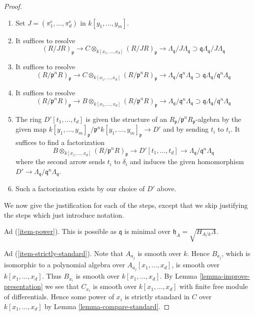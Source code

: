 \begin{proof}
\begin{enumerate}
$$$$
\item
\label{item-fourth-resolve}
Set $J = (\pi_1^e, \ldots, \pi_d^e)$ in $k[y_1, \ldots, y_m]$.
\item
\label{item-fifth-resolve}
It suffices to resolve
$$
(R/JR)_\mathfrak p \to
C \otimes_{k[x_1, \ldots, x_d]} (R/JR)_\mathfrak p \to
\Lambda_\mathfrak q/J\Lambda_\mathfrak q
\supset
\mathfrak q\Lambda_\mathfrak q/J\Lambda_\mathfrak q
$$
\item
\label{item-sixth-resolve}
It suffices to resolve
$$
(R/\mathfrak p^nR)_\mathfrak p \to
C \otimes_{k[x_1, \ldots, x_d]} (R/\mathfrak p^nR)_\mathfrak p \to
\Lambda_\mathfrak q/\mathfrak q^n\Lambda_\mathfrak q
\supset
\mathfrak q\Lambda_\mathfrak q/\mathfrak q^n\Lambda_\mathfrak q
$$
\item
\label{item-seventh-resolve}
It suffices to resolve
$$
(R/\mathfrak p^nR)_\mathfrak p \to
B \otimes_{k[x_1, \ldots, x_d]} (R/\mathfrak p^nR)_\mathfrak p \to
\Lambda_\mathfrak q/\mathfrak q^n\Lambda_\mathfrak q
\supset
\mathfrak q\Lambda_\mathfrak q/\mathfrak q^n\Lambda_\mathfrak q
$$
\item
\label{item-eighth-resolve}
The ring $D'[t_1, \ldots, t_d]$ is given the structure of an
$R_\mathfrak p/\mathfrak p^nR_\mathfrak p$-algebra by the given map
$k[y_1, \ldots, y_m]_\mathfrak p/\mathfrak p^n k[y_1, \ldots, y_m]_\mathfrak p
\to D'$ and by sending $t_i$ to $t_i$. It suffices to find a factorization
$$
B \otimes_{k[x_1, \ldots, x_d]} (R/\mathfrak p^nR)_\mathfrak p
\to D'[t_1, \ldots, t_d] \to
\Lambda_\mathfrak q/\mathfrak q^n\Lambda_\mathfrak q
$$
where the second arrow sends $t_i$ to $\delta_i$ and induces the given
homomorphism $D' \to \Lambda_\mathfrak q/\mathfrak q^n\Lambda_\mathfrak q$.
\item
\label{item-done}
Such a factorization exists by our choice of $D'$ above.
\end{enumerate}
We now give the justification for each of the steps, except that we
skip justifying the steps which just introduce notation.

\medskip\noindent
Ad (\ref{item-power}). This is possible as $\mathfrak q$ is minimal
over $\mathfrak h_A = \sqrt{H_{A/k}\Lambda}$.

\medskip\noindent
Ad (\ref{item-strictly-standard}). Note that $A_{a_j}$ is smooth
over $k$. Hence $B_{a_j}$, which is isomorphic to a polynomial
algebra over $A_{a_j}[x_1, \ldots, x_d]$, is smooth over
$k[x_1, \ldots, x_d]$. Thus $B_{x_i}$ is smooth over $k[x_1, \ldots, x_d]$.
By Lemma \ref{lemma-improve-presentation}
we see that $C_{x_i}$ is smooth over $k[x_1, \ldots, x_d]$
with finite free module of differentials. Hence some power of
$x_i$ is strictly standard in $C$ over $k[x_1, \ldots, x_d]$
by Lemma \ref{lemma-compare-standard}.


\end{proof}
